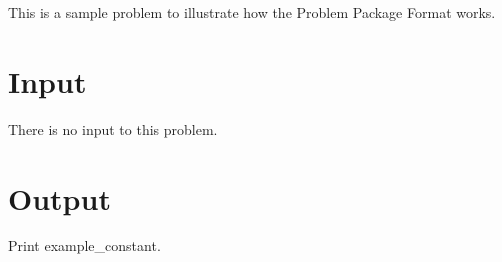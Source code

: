 This is a sample problem to illustrate how the Problem Package Format works.
\section*{Input}
There is no input to this problem.
\section*{Output}
Print {{example_constant}}.
